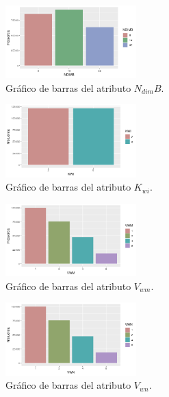 \documentclass[osajnl,twocolumn,showpacs,superscriptaddress,10pt]{revtex4-1} %
\begin{document}
\begin{figure}[H]
    \centering
    \includegraphics[width=0.45\textwidth]{plots/ndimb_bar}
    \caption{Gráfico de barras del atributo $N_{dim}B$.}
    \label{figure:ndimb_bar}
\end{figure}

\begin{figure}[H]
    \centering
    \includegraphics[width=0.45\textwidth]{plots/kwi_bar}
    \caption{Gráfico de barras del atributo $K_{wi}$.}
    \label{figure:kwi_bar}
\end{figure}

\begin{figure}[H]
    \centering
    \includegraphics[width=0.45\textwidth]{plots/vwm_bar}
    \caption{Gráfico de barras del atributo $V_{wm}$.}
    \label{figure:vwm_bar}
\end{figure}

\begin{figure}[H]
    \centering
    \includegraphics[width=0.45\textwidth]{plots/vwn_bar}
    \caption{Gráfico de barras del atributo $V_{wn}$.}
    \label{figure:vwn_bar}
\end{figure}
\end{document}
